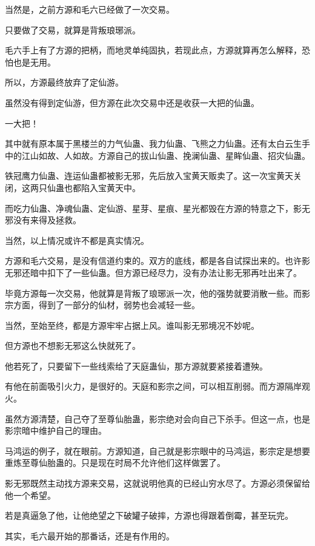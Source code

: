 \begin{this_body}
当然是，之前方源和毛六已经做了一次交易。

只要做了交易，就算是背叛琅琊派。

毛六手上有了方源的把柄，而地灵单纯固执，若现此点，方源就算再怎么解释，恐怕也是无用。

所以，方源最终放弃了定仙游。

虽然没有得到定仙游，但方源在此次交易中还是收获一大把的仙蛊。

一大把！

其中就有原本属于黑楼兰的力气仙蛊、我力仙蛊、飞熊之力仙蛊。还有太白云生手中的江山如故、人如故。方源自己的拔山仙蛊、挽澜仙蛊、星眸仙蛊、招灾仙蛊。

铁冠鹰力仙蛊、连运仙蛊都被影无邪，先后放入宝黄天贩卖了。这一次宝黄天关闭，这两只仙蛊也都陷入宝黄天中。

而吃力仙蛊、净魂仙蛊、定仙游、星芽、星痕、星光都毁在方源的特意之下，影无邪没有来得及拯救。

当然，以上情况或许不都是真实情况。

方源和毛六交易，是没有信道约束的。双方的底线，都是各自试探出来的。也许影无邪还暗中扣下了一些仙蛊。但方源已经尽力，没有办法让影无邪再吐出来了。

毕竟方源每一次交易，他就算是背叛了琅琊派一次，他的强势就要消散一些。而影宗方面，得到了一部分的仙材，弱势也会减轻一些。

当然，至始至终，都是方源牢牢占据上风。谁叫影无邪境况不妙呢。

但方源也不想影无邪这么快就死了。

他若死了，只要留下一些线索给了天庭蛊仙，那方源就要紧接着遭殃。

有他在前面吸引火力，是很好的。天庭和影宗之间，可以相互削弱。而方源隔岸观火。

虽然方源清楚，自己夺了至尊仙胎蛊，影宗绝对会向自己下杀手。但这一点，也是影宗暗中维护自己的理由。

马鸿运的例子，就在眼前。方源知道，自己就是影宗眼中的马鸿运，影宗定是想要重炼至尊仙胎蛊的。只是现在时局不允许他们这样做罢了。

影无邪既然主动找方源来交易，这就说明他真的已经山穷水尽了。方源必须保留给他一个希望。

若是真逼急了他，让他绝望之下破罐子破摔，方源也得跟着倒霉，甚至玩完。

其实，毛六最开始的那番话，还是有作用的。

\end{this_body}

